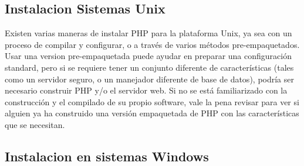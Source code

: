 \documentclass[11pt]{article} %
\begin{document}
\subsection{Instalacion Sistemas Unix}

Existen varias maneras de instalar PHP para la plataforma Unix, ya sea con un proceso de compilar y configurar, o a través de varios métodos pre-empaquetados. Usar una version pre-empaquetada puede ayudar en preparar una configuración standard, pero si se requiere tener un conjunto diferente de características (tales como un servidor seguro, o un manejador diferente de base de datos), podría ser necesario construir PHP y/o el servidor web. Si no se está familiarizado con la construcción y el compilado de su propio software, vale la pena revisar para ver si alguien ya ha construido una versión empaquetada de PHP con las características que se necesitan.

\subsection{Instalacion en sistemas Windows}
\end{document}
